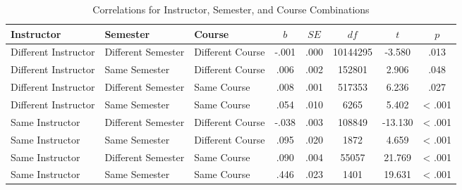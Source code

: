 \documentclass[man]{apa6}
\theoremstyle{definition}
\theoremstyle{definition}
\theoremstyle{definition}
\theoremstyle{remark}
\begin{document}
\begin{table}[tbp]
\begin{center}
\begin{threeparttable}
\caption{\label{tab:rel-table}Correlations for Instructor, Semester, and Course Combinations}
\small{
\begin{tabular}{lllccccc}
\toprule
Instructor & Semester & Course & $b$ & $SE$ & $df$ & $t$ & $p$\\
\midrule
Different Instructor & Different Semester & Different Course & -.001 & .000 & 10144295 & -3.580 & .013\\
Different Instructor & Same Semester & Different Course & .006 & .002 & 152801 & 2.906 & .048\\
Different Instructor & Different Semester & Same Course & .008 & .001 & 517353 & 6.236 & .027\\
Different Instructor & Same Semester & Same Course & .054 & .010 & 6265 & 5.402 & < .001\\
Same Instructor & Different Semester & Different Course & -.038 & .003 & 108849 & -13.130 & < .001\\
Same Instructor & Same Semester & Different Course & .095 & .020 & 1872 & 4.659 & < .001\\
Same Instructor & Different Semester & Same Course & .090 & .004 & 55057 & 21.769 & < .001\\
Same Instructor & Same Semester & Same Course & .446 & .023 & 1401 & 19.631 & < .001\\
\bottomrule
\end{tabular}
}
\end{threeparttable}
\end{center}
\end{table}
\end{document}
